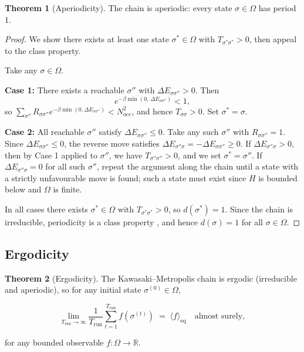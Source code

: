 \documentclass[12pt, a4paper]{article}
\theoremstyle{definition}
\newtheorem{theorem}{Theorem}[section]
\newcommand{\avgE}[1]{\langle #1 \rangle}
\begin{document}
\begin{theorem}[Aperiodicity]
The chain is aperiodic: every state $\sigma \in \Omega$ has period 1.
\end{theorem}

\begin{proof}
We show there exists at least one state $\sigma^* \in \Omega$
with $T_{\sigma^*\sigma^*} > 0$, then appeal to the class property.

Take any $\sigma \in \Omega$.

\textbf{Case 1:} There exists a reachable $\sigma''$ with
$\Delta E_{\sigma\sigma''} > 0$. Then
\[
    e^{-\beta\min(0,\,\Delta E_{\sigma\sigma''})} < 1,
\]
so $\sum_{\sigma''} R_{\sigma\sigma''} e^{-\beta\min(0,\Delta E_{\sigma\sigma''})}
< N_{\mathrm{occ}}^2$, and hence $T_{\sigma\sigma} > 0$.
Set $\sigma^* = \sigma$.

\textbf{Case 2:} All reachable $\sigma''$ satisfy
$\Delta E_{\sigma\sigma''} \leq 0$. Take any such $\sigma''$
with $R_{\sigma\sigma''}=1$. Since $\Delta E_{\sigma\sigma''} \leq 0$,
the reverse move satisfies
$\Delta E_{\sigma''\sigma} = -\Delta E_{\sigma\sigma''} \geq 0$.
If $\Delta E_{\sigma''\sigma} > 0$, then by Case 1 applied to
$\sigma''$, we have $T_{\sigma''\sigma''} > 0$, and we set
$\sigma^* = \sigma''$.
If $\Delta E_{\sigma''\sigma} = 0$ for all such $\sigma''$,
repeat the argument along the chain until a state with a
strictly unfavourable move is found; such a state must exist
since $H$ is bounded below and $\Omega$ is finite.

In all cases there exists $\sigma^* \in \Omega$ with
$T_{\sigma^*\sigma^*} > 0$, so $d(\sigma^*) = 1$.
Since the chain is irreducible, periodicity is a class property
, and hence $d(\sigma) = 1$ for all
$\sigma \in \Omega$.
\end{proof}

\subsection{Ergodicity}

\begin{theorem}[Ergodicity]
    The Kawasaki--Metropolis chain is ergodic (irreducible and
    aperiodic), so for any initial state $\sigma^{(0)} \in \Omega$,

    \begin{equation}
        \lim_{T_{\mathrm{run}} \to \infty}
        \frac{1}{T_{\mathrm{run}}}
        \sum_{t=1}^{T_{\mathrm{run}}} f\!\left(\sigma^{(t)}\right)
        \;=\; \avgE{f}_{\mathrm{eq}}
        \quad \text{almost surely},
        \label{eq:ergodic_theorem}
    \end{equation}

    for any bounded observable $f : \Omega \to \mathbb{R}$.
\end{theorem}
\end{document}
